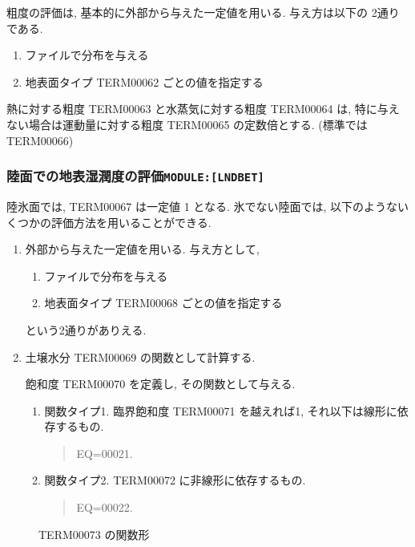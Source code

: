 粗度の評価は, 基本的に外部から与えた一定値を用いる. 
与え方は以下の 2通りである. 
\begin{enumerate}
    \item ファイルで分布を与える
    \item 地表面タイプ TERM00062 ごとの値を指定する
\end{enumerate}

熱に対する粗度 TERM00063 と水蒸気に対する粗度 TERM00064 は, 
特に与えない場合は運動量に対する粗度 TERM00065 の定数倍とする. 
(標準では TERM00066)

\subsubsection{陸面での地表湿潤度の評価\texttt{MODULE:[LNDBET]}}

陸氷面では, TERM00067 は一定値 1 となる.
氷でない陸面では, 以下のようないくつかの評価方法を用いることができる.
\begin{enumerate}
\item 外部から与えた一定値を用いる. 与え方として,
      \begin{enumerate}
      \item ファイルで分布を与える
      \item 地表面タイプ TERM00068 ごとの値を指定する
      \end{enumerate}
      という2通りがありえる.

\item 土壌水分 TERM00069 の関数として計算する.

       飽和度 TERM00070 を定義し,
       その関数として与える.

      \begin{enumerate}
      \item 関数タイプ1.
            臨界飽和度 TERM00071 を越えれば1, それ以下は線形に依存するもの.

        \begin{quote}
EQ=00021.
\end{quote}

      \item 関数タイプ2. TERM00072 に非線形に依存するもの.

        \begin{quote}
EQ=00022.
\end{quote}
      \end{enumerate}

\end{enumerate}

  \begin{figure}[htbp]
    \begin{center}
      \leavevmode
      \caption{TERM00073 の関数形}
    \end{center}
  \end{figure}


